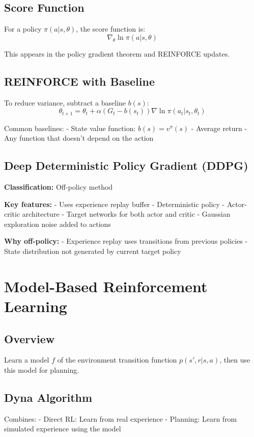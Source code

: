 \documentclass[a4paper,11pt]{article}
\begin{document}
\subsection{Score Function}
For a policy $\pi(a|s,\theta)$, the score function is:
$$\nabla_\theta \ln \pi(a|s,\theta)$$

This appears in the policy gradient theorem and REINFORCE updates.

\subsection{REINFORCE with Baseline}
To reduce variance, subtract a baseline $b(s)$:
$$\theta_{t+1} = \theta_t + \alpha(G_t - b(s_t))\nabla \ln \pi(a_t|s_t, \theta_t)$$

Common baselines:
- State value function: $b(s) = v^{\pi}(s)$
- Average return
- Any function that doesn't depend on the action

\subsection{Deep Deterministic Policy Gradient (DDPG)}
\textbf{Classification:} Off-policy method

\textbf{Key features:}
- Uses experience replay buffer
- Deterministic policy
- Actor-critic architecture
- Target networks for both actor and critic
- Gaussian exploration noise added to actions

\textbf{Why off-policy:}
- Experience replay uses transitions from previous policies
- State distribution not generated by current target policy

\section{Model-Based Reinforcement Learning}

\subsection{Overview}
Learn a model $f$ of the environment transition function $p(s',r|s,a)$, then use this model for planning.

\subsection{Dyna Algorithm}
Combines:
- Direct RL: Learn from real experience
- Planning: Learn from simulated experience using the model
\end{document}
